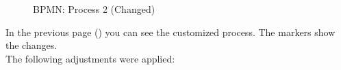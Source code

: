     \begin{figure}[H]
        \centering
        \caption{BPMN: Process 2 (Changed)}
        \label{bpmn2}
    \end{figure}
    In the previous page (\pageref{bpmn2}) you can see the customized process. The markers show the changes.\\
    The following adjustments were applied:
